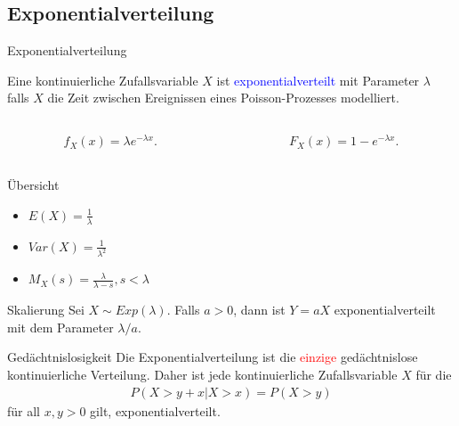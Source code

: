 \documentclass{beamer}
\def\padding{\vspace{0.5cm}}
\def\b{\textcolor{blue}}
\def\r{\textcolor{red}}
\begin{document}
\subsection{Exponentialverteilung}
\begin{frame}{Exponentialverteilung}
    \begin{definition}
        Eine kontinuierliche Zufallsvariable $X$ ist \b{exponentialverteilt} mit Parameter $\lambda$ falls $X$ die Zeit zwischen Ereignissen eines Poisson-Prozesses modelliert.\pause
        \begin{columns}
            \begin{column}{0.5\textwidth}
               \begin{align*}
                    f_X(x) = \lambda e^{- \lambda x}.
                \end{align*}
            \end{column}\pause
            \begin{column}{0.5\textwidth}
                \begin{align*}
                    F_X(x) = 1 - e^{- \lambda x}.
                \end{align*}
            \end{column}
        \end{columns}\pause\par\padding
        \begin{exampleblock}{Übersicht}
            \begin{itemize}
                \item $E(X) = \frac{1}{\lambda}$\pause
                \item $Var(X) = \frac{1}{\lambda^2}$\pause
                \item $M_X(s) = \frac{\lambda}{\lambda - s}, s < \lambda$
            \end{itemize}
        \end{exampleblock}
    \end{definition}
\end{frame}

\begin{frame}
    \begin{block}{Skalierung}
        Sei $X \sim Exp(\lambda)$. Falls $a > 0$, dann ist $Y = a X$ exponentialverteilt mit dem Parameter $\lambda / a$.
    \end{block}\pause\par\padding
    \begin{block}{Gedächtnislosigkeit}
        Die Exponentialverteilung ist die \r{einzige} gedächtnislose kontinuierliche Verteilung. Daher ist jede kontinuierliche Zufallsvariable $X$ für die
        \begin{align*}
            P(X > y + x | X > x) = P(X > y)
        \end{align*}
        für all $x,y > 0$ gilt, exponentialverteilt.
    \end{block}
\end{frame}
\end{document}
